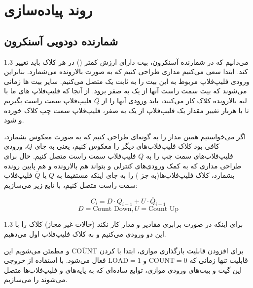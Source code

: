 \documentclass[a4paper,12pt]{article}
\numberwithin{figure}{subsection}
\begin{document}
\section{روند پیاده‌سازی}
\leavevmode\par
\vspace{0.3cm}

\subsection{شمارنده دودویی آسنکرون}
\leavevmode\par
\vspace{0.2cm}

\begin{spacing}{1.3}
می‌دانیم که در شمارنده آسنکرون، بیت دارای ارزش کمتر () در هر کلاک باید تغییر کند. ابتدا سعی می‌کنیم مداری طراحی کنیم که به صورت بالارونده می‌شمارد. بنابراین ورودی  فلیپ‌فلاپ مربوط به این بیت را به ثابت یک متصل می‌کنیم. سایر بیت ها زمانی  می‌شوند که بیت سمت راست آنها از یک به صفر برود. از آنجا که فلیپ‌فلاپ های ما با لبه بالارونده کلاک کار می‌کنند، باید ورودی آنها را از $\overline{Q}$ فلیپ‌فلاپ سمت راست بگیریم تا با هربار تغییر مقدار یک فلیپ‌فلاپ از یک به صفر، فلیپ‌فلاپ سمت چپ کلاک خورده و  شود.

اگر می‌خواستیم همین مدار را به گونه‌ای طراحی کنیم که به صورت معکوس بشمارد، کافی بود کلاک فلیپ‌فلاپ‌های دیگر را معکوس کنیم، یعنی به جای $\overline{Q}$، ورودی فلیپ‌فلاپ‌های سمت چپ را به $Q$ فلیپ‌فلاپ سمت راست متصل کنیم.
حال برای طراحی مداری که به کمک ورودی‌های کنترلی  و  بتواند هم بالارونده و هم پایین رونده بشمارد، کلاک فلیپ‌فلاپ‌ها(به جز ) را به جای اینکه مستقیما به $Q$ یا $\overline{Q}$ فلیپ‌فلاپ سمت راست متصل کنیم، با تابع زیر می‌سازیم:
\end{spacing}
\begin{latin}
$$C_i = D \cdot Q_{i-1} + U \cdot \overline{Q}_{i-1}$$
$$D = \text{Count Down} , U = \text{Count Up}$$
\end{latin}

\begin{spacing}{1.3}
برای اینکه در صورت برابری مقادیر  و  مدار کار نکند (حالات غیر مجاز) کلاک را با  این دو ورودی  می‌کنیم و به کلاک فلیپ‌فلاپ اول می‌دهیم.

\vspace{0.1cm}

برای افزودن قابلیت بارگذاری موازی، ابتدا با  کردن $\overline{\text{COUNT}}$ و  مطمئن می‌شویم این قابلیت تنها زمانی که $\text{COUNT} = 0$ و $\text{LOAD} = 1$ فعال می‌شود. با استفاده از خروجی این گیت  و بیت‌های ورودی موازی، توابع ساده‌ای که به پایه‌های  و  فلیپ‌فلاپ‌ها متصل می‌شوند را می‌سازیم.
\end{spacing}
\end{document}
